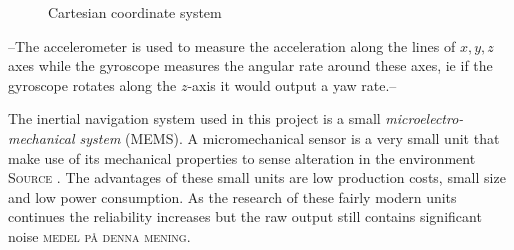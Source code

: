 \documentclass[a4paper,11pt]{kth-mag}
\begin{document}
\begin{figure}[!hbt] 
\centering
{}
%
%

\caption{Cartesian coordinate system}
\label{Figure: cartesian}
\end{figure}
 
 --The accelerometer is used to measure the acceleration along the lines of $x,y,z$ axes while the gyroscope measures the angular rate around these axes, ie if the gyroscope rotates along the $z$-axis it would output a yaw rate.-- 
 
The inertial navigation system used in this project is a small \textit{microelectro-mechanical system} (MEMS). A micromechanical sensor is a very small unit that make use of its mechanical properties to sense alteration in the environment \textsc{Source} . The advantages of these small units are low production costs, small size and low power consumption. As the research of these fairly modern units continues the reliability increases but the raw output still contains significant noise \textsc{medel på denna mening}. \cite{IMUintro}
\end{document}
